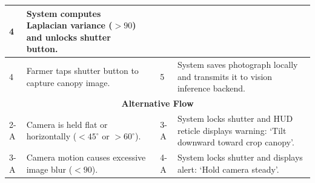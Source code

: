 \documentclass{FastFyp}
\begin{document}
\begin{table}[!ht]
\begin{tabular}{|lllll|}
  \multicolumn{1}{p{0.8cm}|}{4} &
  \multicolumn{1}{p{5.6cm}|}{System computes Laplacian variance ($> 90$) and unlocks shutter button.} \\ \hline
\multicolumn{1}{|p{0.8cm}|}{4} &
  \multicolumn{2}{p{6.0cm}|}{Farmer taps shutter button to capture canopy image.} &
  \multicolumn{1}{p{0.8cm}|}{5} &
  \multicolumn{1}{p{5.6cm}|}{System saves photograph locally and transmits it to vision inference backend.} \\ \hline
\multicolumn{5}{|c|}{\textbf{Alternative Flow}} \\ \hline
\multicolumn{1}{|p{0.8cm}|}{2-A} &
  \multicolumn{2}{p{6.0cm}|}{Camera is held flat or horizontally ($< 45^\circ$ or $> 60^\circ$).} &
  \multicolumn{1}{p{0.8cm}|}{3-A} &
  \multicolumn{1}{p{5.6cm}|}{System locks shutter and HUD reticle displays warning: `Tilt downward toward crop canopy'.} \\ \hline
\multicolumn{1}{|p{0.8cm}|}{3-A} &
  \multicolumn{2}{p{6.0cm}|}{Camera motion causes excessive image blur ($< 90$).} &
  \multicolumn{1}{p{0.8cm}|}{4-A} &
  \multicolumn{1}{p{5.6cm}|}{System locks shutter and displays alert: `Hold camera steady'.} \\ \hline
\end{tabular}
\end{table}
\end{document}
